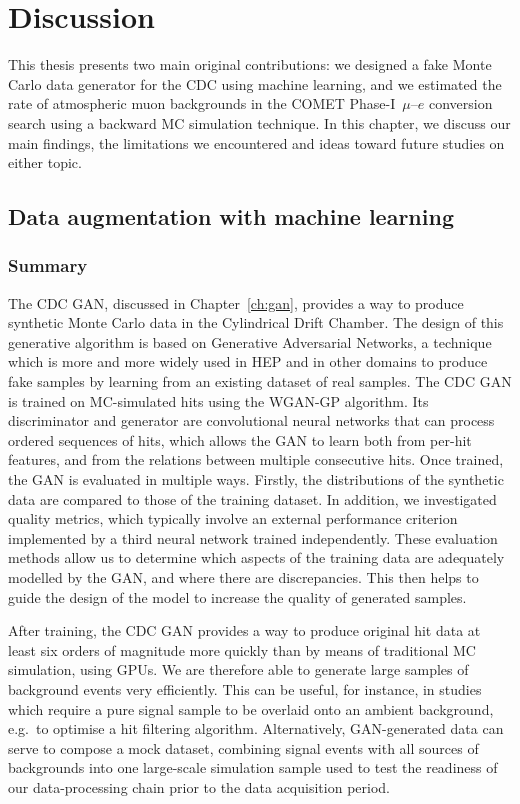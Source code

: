 \chapter{Discussion}
\label{ch:discussion}

This thesis presents two main original contributions: we designed a fake Monte
Carlo data generator for the CDC using machine learning, and we estimated the rate of
atmospheric muon backgrounds in the COMET Phase-I $\,\mu$--$e$ conversion search
using a backward MC simulation technique. In this chapter, we discuss our main
findings, the limitations we encountered and ideas toward future studies on
either topic.

\section{Data augmentation with machine learning}

\subsection{Summary}
The CDC GAN, discussed in Chapter~\ref{ch:gan}, provides a way to produce
synthetic Monte Carlo data in the Cylindrical Drift Chamber. The design of this
generative algorithm is based on Generative Adversarial Networks, a technique
which is more and more widely used in HEP and in other domains to produce fake
samples by learning from an existing dataset of real samples. The CDC GAN is
trained on MC-simulated hits using the WGAN-GP algorithm. Its discriminator and
generator are convolutional neural networks that can process ordered sequences
of hits, which allows the GAN to learn both from per-hit features, and from the
relations between multiple consecutive hits. Once trained, the GAN is evaluated
in multiple ways. Firstly, the distributions of the synthetic data are compared
to those of the training dataset. In addition, we investigated quality metrics,
which typically involve an external performance criterion implemented by a third
neural network trained independently. These evaluation methods allow us to
determine which aspects of the training data are adequately modelled by the GAN,
and where there are discrepancies. This then helps to guide the design of the
model to increase the quality of generated samples.

After training, the CDC GAN provides a way to produce original hit data at least
six orders of magnitude more quickly than by means of traditional MC simulation,
using GPUs. We are therefore able to generate large samples of background events
very efficiently. This can be useful, for instance, in studies which require a
pure signal sample to be overlaid onto an ambient background, e.g.\ to optimise
a hit filtering algorithm. Alternatively, GAN-generated data can serve to
compose a mock dataset, combining signal events with all sources of backgrounds
into one large-scale simulation sample used to test the readiness of our
data-processing chain prior to the data acquisition period.




